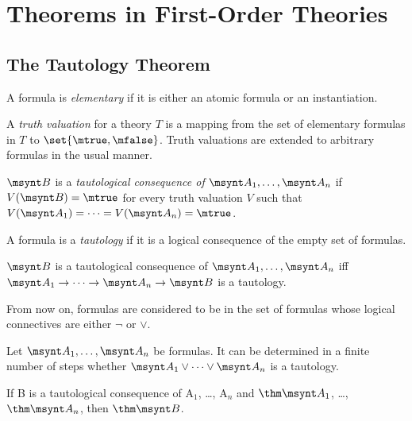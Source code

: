 \section{Theorems in First-Order Theories}

\subsection{The Tautology Theorem}

\begin{definition}
	A formula is \emph{elementary} if it is either an atomic formula or an
	instantiation.
\end{definition}

\begin{definition}
	A \emph{truth valuation} for a theory $T$ is a mapping 
	from the set of elementary formulas in $T$ to $\set{\mtrue, \mfalse}$.
	Truth valuations are extended to arbitrary formulas in the usual
	manner.
\end{definition}

\begin{definition}
	$\msynt B$ is a \emph{tautological consequence of} $\msynt A_1, \dots, \msynt A_n$
	if $V(\msynt B)=\mtrue$ for every truth valuation $V$ such that
	$V(\msynt A_1) = \dots = V(\msynt A_n) = \mtrue$.
\end{definition}

\begin{definition}[Tautology]
	A formula is a \emph{tautology} if it is a logical consequence of the
	empty set of formulas.
\end{definition}

\begin{fact}
	$\msynt B$ is a tautological consequence of $\msynt A_1, \dots, \msynt A_n$ iff
	$\msynt A_1 \to \dots \to \msynt A_n \to \msynt B$ is a tautology.
\end{fact}

From now on, formulas are considered to be in the set of formulas whose
logical connectives are either $\lnot$ or $\lor$.

\begin{fact}
	Let $\msynt A_1, \dots, \msynt A_n$ be formulas.
	 It can be determined in a finite number of steps
	whether $\msynt A_1 \lor \dots \lor \msynt A_n$ is a tautology.
\end{fact}

\begin{theorem}
	If \synt B is a tautological consequence of \synt A$_1$, \dots, 
	\synt A$_n$ and $\thm \msynt A_1$, \dots, $\thm \msynt A_n$,
	then $\thm \msynt B$.
\end{theorem}

